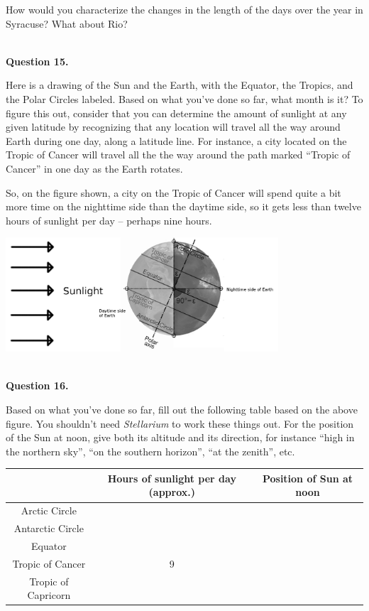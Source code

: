 \documentclass[11pt]{article}
\begin{document}
How would you characterize the changes in the length of the days over the year in Syracuse? What about Rio?

\vspace*{1.5cm}
\hrulefill\\
\newpage
\textbf{Question 15.}

Here is a drawing of the Sun and the Earth, with the Equator, the Tropics, and the Polar Circles labeled.
Based on what you've done so far, what month is it? To figure this out, consider that you can determine the amount of sunlight at any given
latitude by recognizing that any location will travel all the way around Earth during one day, along a latitude line. For instance,
a city located on the Tropic of Cancer will travel all the the way around the path marked ``Tropic of Cancer'' in one day as the Earth rotates. 

So, on the figure shown, a city on the Tropic of Cancer will spend quite a bit more time on the nighttime side than the daytime side, so it gets less than twelve hours of
sunlight per day -- perhaps nine hours.

\begin{center}
\includegraphics[width=4in]{earth-rotate-figure.jpg}
\end{center}

\vspace*{1.5cm}
\hrulefill\\

\textbf{Question 16.}

Based on what you've done so far, fill out the following table based on the above figure.
 You shouldn't need {\it Stellarium} to work these things out. For the position of the Sun
at noon, give both its altitude and its direction, for instance ``high in the northern sky'', ``on the southern horizon'', ``at the zenith'', etc.

\begin{center}
\begin{tabular}{|c| c |c|}
\hline
 & Hours of sunlight per day (approx.) & Position of Sun at noon \\
\hline
Arctic Circle & & \\
\hline
Antarctic Circle & &\\
\hline
Equator & & \\
\hline
Tropic of Cancer & 9 & \\
\hline
Tropic of Capricorn & & \\
\hline
\end{tabular}
\normalsize
\end{center}
\end{document}
